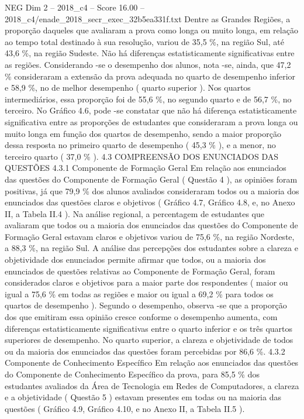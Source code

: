 \begin{textsample}{NEG Dim 2 – 2018\_c4 – Score 16.00 – 2018\_c4/enade\_2018\_secr\_exec\_32b5ea331f.txt}
Dentre as Grandes Regiões, a proporção daqueles que avaliaram a prova como longa ou muito longa, em relação ao tempo total destinado à sua resolução, variou de 35,5 \%, na região Sul, até 43,6 \%, na região Sudeste.
Não há diferenças estatisticamente significativas entre as regiões.
Considerando -se o desempenho dos alunos, nota -se, ainda, que 47,2 \% consideraram a extensão da prova adequada no quarto de desempenho inferior e 58,9 \%, no de melhor desempenho ( quarto superior ).
Nos quartos intermediários, essa proporção foi de 55,6 \%, no segundo quarto e de 56,7 \%, no terceiro.
No Gráfico 4.6, pode -se constatar que não há diferença estatisticamente significativa entre as proporções de estudantes que consideraram a prova longa ou muito longa em função dos quartos de desempenho, sendo a maior proporção dessa resposta no primeiro quarto de desempenho ( 45,3 \% ), e a menor, no terceiro quarto ( 37,0 \% ). 4.3 COMPREENSÃO DOS ENUNCIADOS DAS QUESTÕES 4.3.1 Componente de Formação Geral Em relação aos enunciados das questões do Componente de Formação Geral ( Questão 4 ), as opiniões foram positivas, já que 79,9 \% dos alunos avaliados consideraram todos ou a maioria dos enunciados das questões claros e objetivos ( Gráfico 4.7, Gráfico 4.8, e, no Anexo II, a Tabela II.4 ).
Na análise regional, a percentagem de estudantes que avaliaram que todos ou a maioria dos enunciados das questões do Componente de Formação Geral estavam claros e objetivos variou de 75,6 \%, na região Nordeste, a 88,3 \%, na região Sul.
A análise das percepções dos estudantes sobre a clareza e objetividade dos enunciados permite afirmar que todos, ou a maioria dos enunciados de questões relativas ao Componente de Formação Geral, foram considerados claros e objetivos para a maior parte dos respondentes ( maior ou igual a 75,6 \% em todas as regiões e maior ou igual a 69,2 \% para todos os quartos de desempenho ).
Segundo o desempenho, observa -se que a proporção dos que emitiram essa opinião cresce conforme o desempenho aumenta, com diferenças estatisticamente significativas entre o quarto inferior e os três quartos superiores de desempenho.
No quarto superior, a clareza e objetividade de todos ou da maioria dos enunciados das questões foram percebidas por 86,6 \%. 4.3.2 Componente de Conhecimento Específico Em relação aos enunciados das questões do Componente de Conhecimento Específico da prova, para 85,5 \% dos estudantes avaliados da Área de Tecnologia em Redes de Computadores, a clareza e a objetividade ( Questão 5 ) estavam presentes em todas ou na maioria das questões ( Gráfico 4.9, Gráfico 4.10, e no Anexo II, a Tabela II.5 ).

\end{textsample}
